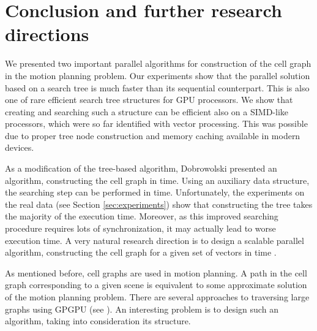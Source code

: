 \documentclass[a4paper]{article}
\begin{document}
\section{Conclusion and further research directions} \label{sec:future}

We presented two important parallel algorithms for construction of the cell graph in the motion planning problem. Our experiments show that the parallel solution based on a search tree is much faster than its sequential counterpart. This is also one of rare efficient search tree structures for GPU processors. We show that creating and searching such a structure can be efficient also on a SIMD-like processors, which were so far identified with vector processing. This was possible due to proper tree node construction and memory caching available in modern devices.

As a modification of the tree-based algorithm, Dobrowolski presented an algorithm, constructing the cell graph in  time. Using an auxiliary data structure, the searching step can be performed in  time.
Unfortunately, the experiments on the real data (see Section \ref{sec:experiments}) show that constructing the tree takes the majority of the execution time. Moreover, as this improved searching procedure requires lots of synchronization, it may actually lead to worse execution time.
A very natural research direction is to design a scalable parallel algorithm, constructing the cell graph for a given set of vectors in time .

As mentioned before, cell graphs are used in motion planning. A path in the cell graph corresponding to a given scene is equivalent to some approximate solution of the motion planning problem.
There are several approaches to traversing large graphs using GPGPU (see \cite{conf/ppopp/MerrillGG12,kaczmarski2015improving}). An interesting problem is to design such an algorithm, taking into consideration its structure.
\end{document}
